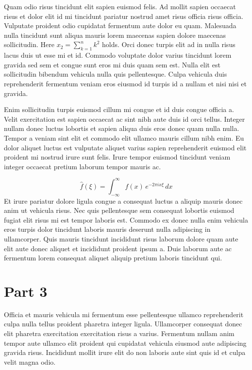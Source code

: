 \documentclass[10pt,a4paper,twocolumn]{article}
\begin{document}
Quam odio risus tincidunt elit sapien euismod felis. Ad
mollit sapien occaecat risus et dolor elit id mi tincidunt
pariatur nostrud amet risus officia risus officia. Vulputate
proident odio cupidatat fermentum aute dolor eu quam.
Malesuada nulla tincidunt sunt aliqua mauris lorem maecenas
sapien dolore maecenas sollicitudin. Here $x_{2} =
\sum_{k=1}^{n} k^{2}$ holds. Orci donec turpis elit ad in
nulla risus lacus duis ut esse mi et id. Commodo voluptate
dolor varius tincidunt lorem gravida sed sem et congue sunt
eros mi duis quam sem est. Nulla elit est sollicitudin
bibendum vehicula nulla quis pellentesque. Culpa vehicula
duis reprehenderit fermentum veniam eros eiusmod id turpis
id a nullam et nisi nisi et gravida.

Enim sollicitudin turpis euismod cillum mi congue et id duis
congue officia a. Velit exercitation est sapien occaecat ac
sint nibh aute duis id orci tellus. Integer nullam donec
luctus lobortis et sapien aliqua duis eros donec quam nulla
nulla. Tempor a veniam sint elit et commodo elit ullamco
mauris cillum nibh enim. Eu dolor aliquet luctus est
vulputate aliquet varius sapien reprehenderit euismod elit
proident mi nostrud irure sunt felis. Irure tempor euismod
tincidunt veniam integer occaecat pretium laborum tempor
mauris ac.

\begin{equation}
  \hat f(\xi) = \int_{-\infty}^{\infty} f(x)\, e^{-2\pi i x \xi} \, dx
\end{equation}
Et irure pariatur dolore ligula congue a consequat luctus a
aliquip mauris donec anim ut vehicula risus. Nec quis
pellentesque sem consequat lobortis euismod fugiat elit
risus mi est tempor laboris est. Commodo ex donec nulla enim
vehicula eros turpis dolor tincidunt laboris mauris deserunt
nulla adipiscing in ullamcorper. Quis mauris tincidunt
incididunt risus laborum dolore quam aute elit aute donec
aliquet et incididunt proident ipsum a. Duis laborum aute ac
fermentum lorem consequat aliquet aliquip pretium laboris
tincidunt qui.

\section{Part 3}
Officia et mauris vehicula mi fermentum esse pellentesque
ullamco reprehenderit culpa nulla tellus proident pharetra
integer ligula. Ullamcorper consequat donec elit pharetra
exercitation exercitation risus a varius. Fermentum nullam
anim tempor aute ullamco elit proident qui cupidatat
vehicula eiusmod aute adipiscing gravida risus. Incididunt
mollit irure elit do non laboris aute sint quis id et culpa
velit magna odio.
\end{document}
